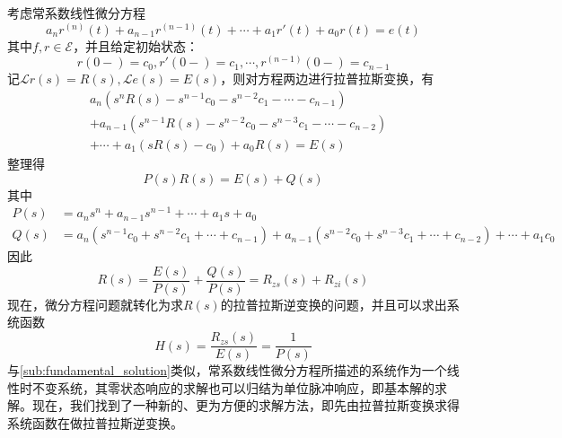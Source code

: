 \documentclass{ctexbook}
\begin{document}
考虑常系数线性微分方程
\[a_n r^{(n)}(t)+a_{n-1}r^{(n-1)}(t)+\cdots +a_1 r'(t)+a_0 r(t)=e(t)\]
其中$f,r\in\mathcal{E} $，并且给定初始状态：
\[r(0-)=c_0,r'(0-)=c_1,\cdots,r^{(n-1)}(0-)=c_{n-1}\]
记$\mathcal{L} r(s)=R(s),\mathcal{L} e(s)=E(s)$，则对方程两边进行拉普拉斯变换，有
\begin{align*}
    &a_n\left(s^n R(s)-s^{n-1}c_0 -s^{n-2}c_1 -\cdots -c_{n-1}\right)\\
    &+a_{n-1}\left(s^{n-1} R(s)-s^{n-2}c_0 -s^{n-3}c_1 -\cdots -c_{n-2}\right)\\
    &+\cdots +a_1\left(s R(s)-c_0\right)+a_0 R(s)=E(s)
\end{align*}
整理得
\[P(s)R(s)=E(s)+Q(s)\]
其中\begin{align*}
P(s)&=a_n s^n +a_{n-1} s^{n-1}+\cdots +a_1 s+a_0\\
Q(s)&=a_n\left(s^{n-1}c_0 +s^{n-2}c_1 +\cdots +c_{n-1}\right)+a_{n-1}\left(s^{n-2}c_0 +s^{n-3}c_1 +\cdots +c_{n-2}\right)+\cdots +a_1 c_0
\end{align*}
因此
\[R(s)=\frac{E(s)}{P(s)}+\frac{Q(s)}{P(s)}=R_{zs}(s)+R_{zi}(s)\]
现在，微分方程问题就转化为求$R(s)$的拉普拉斯逆变换的问题，并且可以求出系统函数
\[H(s)=\frac{R_{zs}(s)}{E(s)}=\frac{1}{P(s)}\]
与\ref{sub:fundamental_solution}类似，常系数线性微分方程所描述的系统作为一个线性时不变系统，其零状态响应的求解也可以归结为单位脉冲响应，即基本解的求解。现在，我们找到了一种新的、更为方便的求解方法，即先由拉普拉斯变换求得系统函数在做拉普拉斯逆变换。
\end{document}
